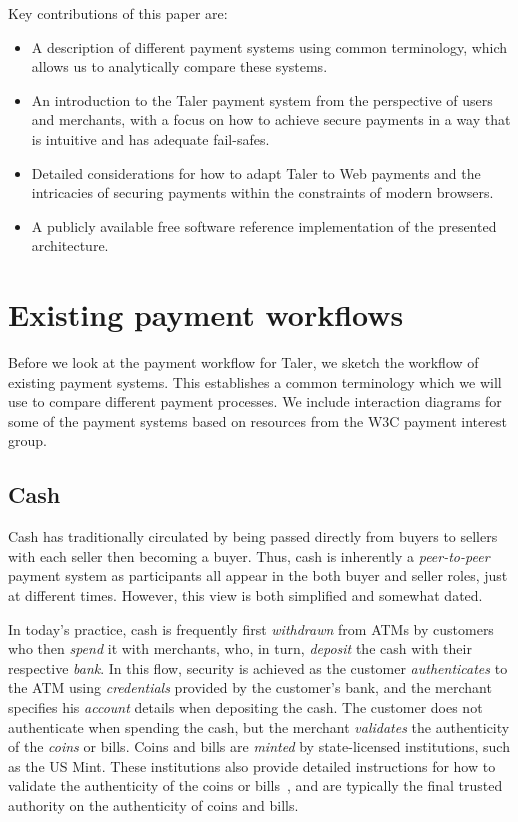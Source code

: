 \documentclass{llncs}
\begin{document}
Key contributions of this paper are:
\begin{itemize}
 \item A description of different payment systems using
  common terminology, which allows us to analytically compare
  these systems.
 \item An introduction to the Taler payment system from the
  perspective of users and merchants, with a focus on how
  to achieve secure payments in a way that is intuitive and
  has adequate fail-safes.
 \item Detailed considerations for how to adapt Taler to
  Web payments and the intricacies of securing payments
  within the constraints of modern browsers.
 \item A publicly available free software
  reference implementation of the presented architecture.
\end{itemize}


\section{Existing payment workflows}

Before we look at the payment workflow for Taler, we sketch the
workflow of existing payment systems. This establishes a common
terminology which we will use to compare different payment processes.
We include interaction diagrams for some of the payment systems
based on resources from the W3C payment interest group.

\subsection{Cash}

Cash has traditionally circulated by being passed directly from buyers
to sellers with each seller then becoming a buyer. Thus, cash is
inherently a {\em peer-to-peer} payment system as participants all
appear in the both buyer and seller roles, just at different times.
However, this view is both simplified and
somewhat dated.

In today's practice, cash is frequently first {\em withdrawn} from
ATMs by customers who then {\em spend} it with merchants, who, in turn,
{\em deposit} the cash with their respective {\em bank}.  In this
flow, security is achieved as the customer {\em authenticates} to the
ATM using {\em credentials} provided by the customer's bank, and the
merchant specifies his {\em account} details when depositing the cash.
The customer does not authenticate when spending the cash, but the
merchant {\em validates} the authenticity of the {\em coins} or bills.
Coins and bills are {\em minted} by state-licensed institutions, such
as the US Mint.  These institutions also provide detailed instructions
for how to validate the authenticity of the coins or
bills~\cite{ezb2016ourmoney}, and are typically the final trusted
authority on the authenticity of coins and bills.
\end{document}
